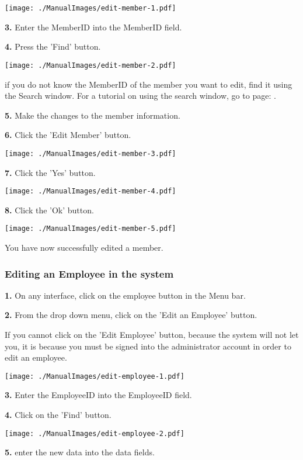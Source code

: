 \texttt{[image: ./ManualImages/edit-member-1.pdf]}

\textbf{3.} Enter the MemberID into the MemberID field. 

\textbf{4.} Press the 'Find' button.

\texttt{[image: ./ManualImages/edit-member-2.pdf]}

if you do not know the MemberID of the member you want to edit, find it using the Search window. For a tutorial on using the search window, go to page: . 

\textbf{5.} Make the changes to the member information.

\textbf{6.}  Click the 'Edit Member' button.

\texttt{[image: ./ManualImages/edit-member-3.pdf]}

\textbf{7.}  Click the 'Yes' button.

\texttt{[image: ./ManualImages/edit-member-4.pdf]}

\textbf{8.} Click the 'Ok' button.

\texttt{[image: ./ManualImages/edit-member-5.pdf]}

You have now successfully edited a member.

\pagebreak
\subsubsection{Editing an Employee in the system}
\label{fig:Editing an Employee in the system}

\textbf{1.} On any interface, click on the employee button in the Menu bar.

\textbf{2.} From the drop down menu, click on the 'Edit an Employee' button.

If you cannot click on the 'Edit Employee' button, because the system will not let you, it is because you must be signed into the administrator account in order to edit an employee.

\texttt{[image: ./ManualImages/edit-employee-1.pdf]}

\textbf{3.} Enter the EmployeeID into the EmployeeID field.

\textbf{4.} Click on the 'Find' button.

\texttt{[image: ./ManualImages/edit-employee-2.pdf]}

\textbf{5.} enter the new data into the data fields.

